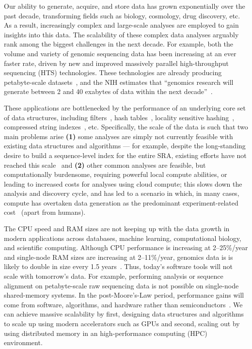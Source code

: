 Our ability to generate, acquire, and store data has grown exponentially over
the past decade, transforming fields such as biology, cosmology, drug discovery,
etc.  
As a result, increasingly complex and large-scale analyses are employed to
gain insights into this data. 
The scalability of these complex data
analyses arguably rank among the biggest challenges in the next decade. For
example, both the volume and variety of genomic sequencing data has been
increasing at an ever faster rate, driven by new and improved massively parallel
high-throughput sequencing (HTS) technologies.  These technologies are already
producing petabyte-scale datasets~\cite{kodama2012sequence}, and the NIH
estimates that ``genomics research will generate between 2 and 40 exabytes of
data within the next decade''~\cite{NHGRIDataScience}. 


These applications are bottlenecked by the performance of an underlying core set
of data structures, including filters~\cite{PandeyAlBe18, solomon2016fast}, hash
tables~\cite{solomon2016fast,almodaresi2022incrementally}, locality sensitive
hashing~\cite{Marais2019}, compressed string
indexes~\cite{Almodaresi2018Pufferfish}, etc. Specifically, the scale of the
data is such that two main problems arise \textbf{(1)} some analyses are simply
not currently feasible with existing data structures and algorithms --- for
example, despite the long-standing desire to build a sequence-level index for
the entire SRA, existing efforts have not reached this
scale~\cite{Karasikov2020, HarrisM20, SolomonK17, almodaresi2022incrementally,
AlmodaresiPFJP20,PandeyAlBe18} and \textbf{(2)} other common analyses are
feasible, but computationally burdensome, requiring powerful local compute
abilities, or leading to increased costs for analyses using cloud compute; this
slows down the analysis and discovery cycle, and has led to a scenario in which,
in many cases, compute has overtaken data generation as the predominant
experiment-related cost~\cite{Muir_2016} (apart from humans).

The CPU speed and RAM sizes are not keeping up with the data growth in modern
applications across databases, machine learning, computational biology, and
scientific computing. Although CPU performance is increasing at 2--25\%/year and
single-node RAM sizes are increasing at 2--11\%/year, genomics data is is likely
to double in size every 1.5 years~\cite{kodama2012sequence}. Thus, today's
software tools will not scale with tomorrow's data. For example, performing
\kmer analysis or sequence alignment on petabyte-scale raw sequencing data is
not possible on single-node shared-memory systems.
In the post-Moore’s-Law period, performance gains will come from software,
algorithms, and hardware rather than semiconductors~\cite{leiserson2020there}.
We can achieve massive scalability by first, designing data structures and
algorithms to scale up using modern accelerators such as GPUs and second,
scaling out by using distributed memory in an high-performance computing (HPC)
environment.



